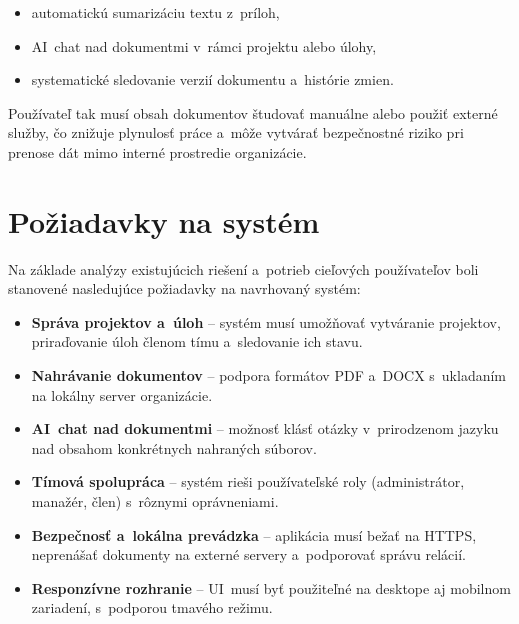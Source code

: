 \begin{itemize}
  \item automatickú sumarizáciu textu z~príloh,
  \item AI~chat nad dokumentmi v~rámci projektu alebo úlohy,
  \item systematické sledovanie verzií dokumentu a~histórie zmien.
\end{itemize}

        Používateľ tak musí obsah dokumentov študovať manuálne alebo použiť externé
služby, čo znižuje plynulosť práce a~môže vytvárať bezpečnostné riziko pri prenose dát
mimo interné prostredie organizácie.

\section{Požiadavky na systém}

        Na základe analýzy existujúcich riešení a~potrieb cieľových používateľov boli
stanovené nasledujúce požiadavky na navrhovaný systém:

\begin{itemize}
  \item \textbf{Správa projektov a~úloh} -- systém musí umožňovať vytváranie projektov,
        priraďovanie úloh členom tímu a~sledovanie ich stavu.
  \item \textbf{Nahrávanie dokumentov} -- podpora formátov PDF a~DOCX s~ukladaním
        na lokálny server organizácie.
  \item \textbf{AI~chat nad dokumentmi} -- možnosť klásť otázky v~prirodzenom jazyku
        nad obsahom konkrétnych nahraných súborov.
  \item \textbf{Tímová spolupráca} -- systém rieši používateľské roly (administrátor,
        manažér, člen) s~rôznymi oprávneniami.
  \item \textbf{Bezpečnosť a~lokálna prevádzka} -- aplikácia musí bežať na HTTPS,
        neprenášať dokumenty na externé servery a~podporovať správu relácií.
  \item \textbf{Responzívne rozhranie} -- UI~musí byť použiteľné na desktope aj mobilnom
        zariadení, s~podporou tmavého režimu.
\end{itemize}
